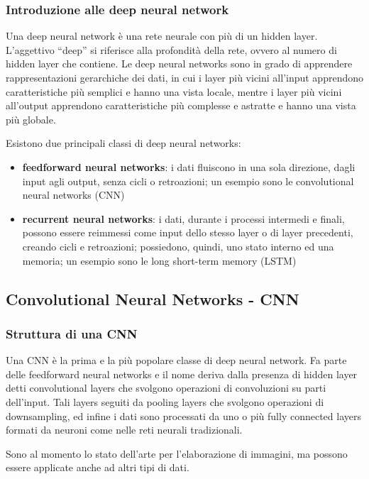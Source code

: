 \subsubsection*{Introduzione alle deep neural network}
Una deep neural network è una rete neurale con più di un hidden layer. L'aggettivo ``deep'' si riferisce alla profondità della
rete, ovvero al numero di hidden layer che contiene. Le deep neural networks sono in grado di apprendere rappresentazioni
gerarchiche dei dati, in cui i layer più vicini all'input apprendono caratteristiche più semplici e hanno una vista locale,
mentre i layer più vicini all'output apprendono caratteristiche più complesse e astratte e hanno una vista più globale.

Esistono due principali classi di deep neural networks:
\begin{itemize}
	\item \textbf{feedforward neural networks}: i dati fluiscono in una sola direzione, dagli input agli output, senza cicli
	o retroazioni; un esempio sono le convolutional neural networks (CNN)
	\item \textbf{recurrent neural networks}: i dati, durante i processi intermedi e finali, possono essere reimmessi come input
	dello stesso layer o di layer precedenti, creando cicli e retroazioni; possiedono, quindi, uno stato interno ed una memoria;
	un esempio sono le long short-term memory (LSTM)
\end{itemize}

\newpage

\subsection{Convolutional Neural Networks - CNN}
\subsubsection*{Struttura di una CNN}
Una CNN è la prima e la più popolare classe di deep neural network. Fa parte delle feedforward neural networks e il nome deriva
dalla presenza di hidden layer detti convolutional layers che svolgono operazioni di convoluzioni su parti dell'input. Tali
layers seguiti da pooling layers che svolgono operazioni di downsampling, ed infine i dati sono processati da uno o più fully
connected layers formati da neuroni come nelle reti neurali tradizionali.

Sono al momento lo stato dell'arte per l'elaborazione di immagini, ma possono essere applicate anche ad altri tipi di dati.

